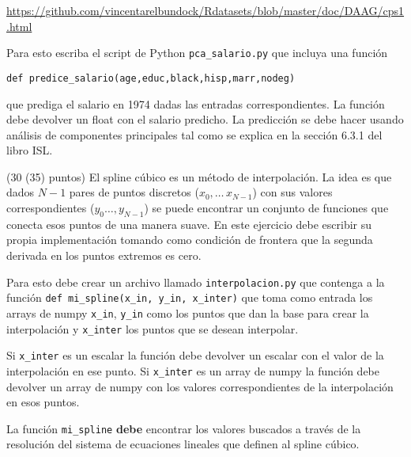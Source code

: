 \documentclass[11pt,letterpaper]{exam}
\begin{document}
\begin{questions}
\url{https://github.com/vincentarelbundock/Rdatasets/blob/master/doc/DAAG/cps1.html}

    Para esto escriba el script de Python \verb"pca_salario.py" que
    incluya una funci\'on

    \verb"def predice_salario(age,educ,black,hisp,marr,nodeg)" 

    que
    prediga el salario en 1974 dadas las entradas correspondientes. 
    La funci\'on debe devolver un float con el salario predicho.
    La predicci\'on se debe hacer usando an\'alisis de componentes
    principales tal como se explica en la secci\'on 6.3.1 del libro ISL.


(30 (35) puntos) El spline c\'ubico es un m\'etodo de interpolaci\'on. La idea es que dados
$N-1$ pares de puntos discretos ($x_0,\ldots\, x_{N-1}$) con sus valores
correspondientes ($y_0\ldots, y_{N-1}$) se puede encontrar un conjunto
de funciones que conecta esos puntos de una manera suave.
En este ejercicio debe escribir su propia implementaci\'on tomando
como condici\'on de frontera que la segunda derivada en los puntos
extremos es cero.

Para esto debe crear un archivo llamado \verb"interpolacion.py" que
contenga a la funci\'on \verb"def mi_spline(x_in, y_in, x_inter)" que
toma como entrada los arrays de numpy \verb"x_in", \verb"y_in" como los
puntos que dan la base para crear la interpolaci\'on y \verb"x_inter"
los puntos que se desean interpolar. 

Si \verb"x_inter" es un escalar
la funci\'on debe devolver un escalar con el valor de la
interpolaci\'on en ese punto.
Si \verb"x_inter" es un array de numpy la funci\'on debe devolver un
array de numpy con los valores correspondientes de la interpolaci\'on
en esos puntos.

La funci\'on \verb"mi_spline" {\bf debe} encontrar los valores buscados
a trav\'es de la resoluci\'on del sistema de ecuaciones lineales que
definen al spline c\'ubico.

\end{questions}
\end{document}
